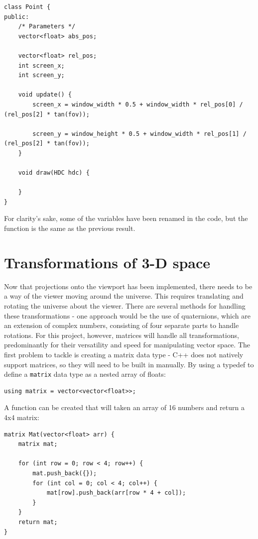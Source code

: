 \documentclass{article}
\begin{document}
\begin{lstlisting}
class Point {
public:
	/* Parameters */
	vector<float> abs_pos;
	
	vector<float> rel_pos;
	int screen_x;
	int screen_y;	
	
	void update() {
		screen_x = window_width * 0.5 + window_width * rel_pos[0] / (rel_pos[2] * tan(fov));

		screen_y = window_height * 0.5 + window_width * rel_pos[1] / (rel_pos[2] * tan(fov));
	}
	
	void draw(HDC hdc) {
	
	}
}

\end{lstlisting}
For clarity's sake, some of the variables have been renamed in the code, but the function is the same as the previous result.

\newpage

\section{Transformations of 3-D space}
Now that projections onto the viewport has been implemented, there needs to be a way of the viewer moving around the universe. This requires translating and rotating the universe about the viewer.
\newline
\newline
There are several methods for handling these transformations - one approach would be the use of quaternions, which are an extension of complex numbers, consisting of four separate parts to handle rotations. For this project, however, matrices will handle all transformations, predominantly for their versatility and speed for manipulating vector space.
\newline
\newline
The first problem to tackle is creating a matrix data type - C++ does not natively support matrices, so they will need to be built in manually. By using a typedef to define a \verb|matrix| data type as a nested array of floats:

\begin{lstlisting}
using matrix = vector<vector<float>>;
\end{lstlisting}

A function can be created that will taken an array of 16 numbers and return a 4x4 matrix:
\begin{lstlisting}
matrix Mat(vector<float> arr) {
	matrix mat;

	for (int row = 0; row < 4; row++) {
		mat.push_back({});
		for (int col = 0; col < 4; col++) {
			mat[row].push_back(arr[row * 4 + col]);
		}
	}
	return mat;
}
\end{lstlisting}
\end{document}
